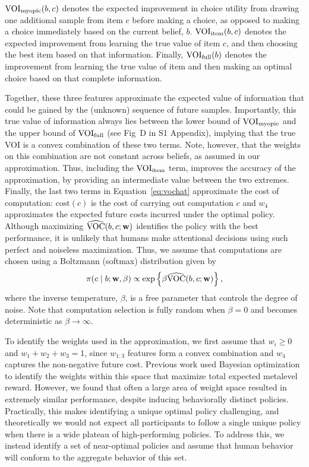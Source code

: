 $\text{VOI}_\text{myopic}(b,c)$ denotes the expected improvement in choice utility from drawing one additional sample from item $c$ before making a choice, as opposed to making a choice immediately based on the current belief, $b$. $\text{VOI}_\text{item}(b,c)$ denotes the expected improvement from learning the true value of item $c$, and then choosing the best item based on that information. Finally, $\text{VOI}_\text{full}(b)$ denotes the improvement from learning the true value of  item and then making an optimal choice based on that complete information.

Together, these three features approximate the expected value of information that could be gained by the (unknown) sequence of future samples. Importantly, this true value of information always lies between the lower bound of $\text{VOI}_\text{myopic}$ and the upper bound of $\text{VOI}_\text{full}$ (see Fig~D in S1 Appendix), implying that the true VOI is a convex combination of these two terms. Note, however, that the weights on this combination are not constant across beliefs, as assumed in our approximation. Thus, including the $\text{VOI}_\text{item}$ term, improves the accuracy of the approximation, by providing an intermediate value between the two extremes. Finally, the last two terms in Equation~\ref{eq:vochat} approximate the cost of computation: $\text{cost}(c)$ is the cost of carrying out computation $c$ and $w_{4}$ approximates the expected future costs incurred under the optimal policy.
Although maximizing $\widehat{\text{VOC}}(b, c; \mathbf{w})$ identifies the policy with the best performance, it is unlikely that humans make attentional decisions using such perfect and noiseless maximization. Thus, 
we assume that computations are chosen using a Boltzmann (softmax) distribution   \citep{mcfadden2001economic} given  by
\[
\pi(c \mid b; \mathbf{w}, \beta) \propto \exp \left\{ \beta\widehat{\text{VOC}}(b, c; \mathbf{w}) \right\},
\]
where the inverse temperature, $\beta$, is a free parameter that controls the degree of noise. Note that computation selection is fully random when $\beta=0$ and becomes deterministic as $\beta\rightarrow\infty$.

To identify the weights used in the approximation, we first assume that $w_{i}\ge0$ and $w_{1}+w_{2}+w_{3}=1$, since $w_{1:3}$ features form a convex combination and $w_4$ captures the non-negative future cost. Previous work \citep{callaway2018learning} used Bayesian optimization to identify the weights within this space that maximize total expected metalevel reward. However, we found that often a large area of weight space resulted in extremely similar performance, despite inducing behaviorally distinct policies. Practically, this makes identifying a unique optimal policy challenging, and theoretically we would not expect all participants to follow a single unique policy when there is a wide plateau of high-performing policies. To address this, we instead identify a set of near-optimal policies and assume that human behavior will conform to the aggregate behavior of this set. 

